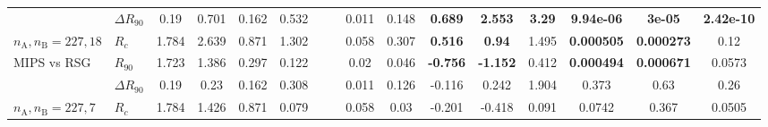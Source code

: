 \begin{tabular}{@{} ll @{\quad } S[round-mode=places]S[round-mode=places] S[round-mode=places]S[round-mode=places] SS SS @{\quad\quad\quad} SSS[round-mode=places] @{\quad} S@{}S@{}S @{}}
 & \(\Delta R_{90}\) & 0.19 & 0.701 & 0.162 & 0.532 &   &   & 0.011 & 0.148 & \bfseries 0.689 & \bfseries 2.553 & \bfseries 3.29 & \bfseries 9.94e-06 & \bfseries 3e-05 & \bfseries 2.42e-10\\
\(n_{\text{A}}, n_{\text{B}} = 227, 18\) & \(R_{c}\) & 1.784 & 2.639 & 0.871 & 1.302 &   &   & 0.058 & 0.307 & \bfseries 0.516 & \bfseries 0.94 & 1.495 & \bfseries 0.000505 & \bfseries 0.000273 & 0.12\\
\addlinespace
MIPS vs RSG & \(R_{90}\) & 1.723 & 1.386 & 0.297 & 0.122 &   &   & 0.02 & 0.046 & \bfseries -0.756 & \bfseries -1.152 & 0.412 & \bfseries 0.000494 & \bfseries 0.000671 & 0.0573\\
 & \(\Delta R_{90}\) & 0.19 & 0.23 & 0.162 & 0.308 &   &   & 0.011 & 0.126 & -0.116 & 0.242 & 1.904 & 0.373 & 0.63 & 0.26\\
\(n_{\text{A}}, n_{\text{B}} = 227, 7\) & \(R_{c}\) & 1.784 & 1.426 & 0.871 & 0.079 &   &   & 0.058 & 0.03 & -0.201 & -0.418 & 0.091 & 0.0742 & 0.367 & 0.0505
\\
\bottomrule
\end{tabular}
